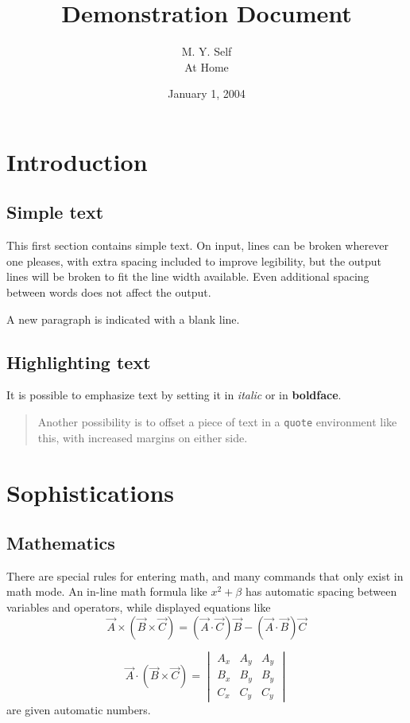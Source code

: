 \documentclass[a4paper,12pt]{article}
\title{Demonstration Document}
\author{M. Y. Self\\
	At Home}
\date{January 1, 2004}
\begin{document}
\maketitle

\section{Introduction}

\subsection{Simple text}
This first section contains simple text.
On input, lines can be broken wherever one pleases,
  with extra spacing included to improve legibility,
  but the output lines will be broken to fit the
  line width available. Even additional   spacing
    between   words   does  not   affect
	  the output.
	  
A new paragraph is indicated with a blank line.

\subsection{Highlighting text}
It is possible to emphasize text by setting it in
\emph{italic} or in \textbf{boldface}.

\begin{quote}
Another possibility is to offset a piece of text in a
\texttt{quote} environment like this, with increased
margins on either side.
\end{quote}

\section{Sophistications}

\subsection{Mathematics}

There are special rules for entering math, and many
commands that only exist in math mode. An
in-line math formula like $x^2+\beta$
has automatic spacing between variables and
operators, while displayed equations like
\begin{equation}
	\vec{A} \times (\vec{B}\times\vec{C}) =
	(\vec{A}\cdot\vec{C})\vec{B} - 
	(\vec{A}\cdot\vec{B})\vec{C}
\end{equation}

\begin{equation}
	\vec{A}\cdot(\vec{B}\times\vec{C}) = 
	\begin{vmatrix}
		A_x & A_y & A_y \\
		B_x & B_y & B_y \\
		C_x & C_y & C_y
	\end{vmatrix}
\end{equation}
are given automatic numbers.
\end{document}
